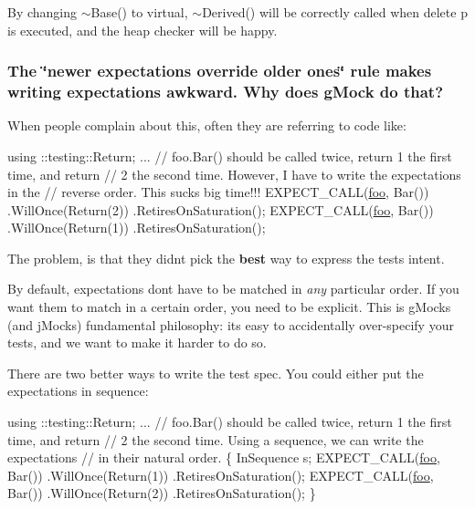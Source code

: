 By changing {\ttfamily $\sim$\+Base()} to virtual, {\ttfamily $\sim$\+Derived()} will be correctly called when {\ttfamily delete p} is executed, and the heap checker will be happy.

\subsubsection*{The \char`\"{}newer expectations override older ones\char`\"{} rule makes writing expectations awkward. Why does g\+Mock do that?}

When people complain about this, often they are referring to code like\+:


\begin{DoxyCode}
using ::testing::Return;
...
  \textcolor{comment}{// foo.Bar() should be called twice, return 1 the first time, and return}
  \textcolor{comment}{// 2 the second time.  However, I have to write the expectations in the}
  \textcolor{comment}{// reverse order.  This sucks big time!!!}
  EXPECT\_CALL(\mbox{\hyperlink{namespacefoo}{foo}}, Bar())
      .WillOnce(Return(2))
      .RetiresOnSaturation();
  EXPECT\_CALL(\mbox{\hyperlink{namespacefoo}{foo}}, Bar())
      .WillOnce(Return(1))
      .RetiresOnSaturation();
\end{DoxyCode}


The problem, is that they didn\textquotesingle{}t pick the {\bfseries best} way to express the test\textquotesingle{}s intent.

By default, expectations don\textquotesingle{}t have to be matched in {\itshape any} particular order. If you want them to match in a certain order, you need to be explicit. This is g\+Mock\textquotesingle{}s (and j\+Mock\textquotesingle{}s) fundamental philosophy\+: it\textquotesingle{}s easy to accidentally over-\/specify your tests, and we want to make it harder to do so.

There are two better ways to write the test spec. You could either put the expectations in sequence\+:


\begin{DoxyCode}
using ::testing::Return;
...
  \textcolor{comment}{// foo.Bar() should be called twice, return 1 the first time, and return}
  \textcolor{comment}{// 2 the second time.  Using a sequence, we can write the expectations}
  \textcolor{comment}{// in their natural order.}
  \{
    InSequence s;
    EXPECT\_CALL(\mbox{\hyperlink{namespacefoo}{foo}}, Bar())
        .WillOnce(Return(1))
        .RetiresOnSaturation();
    EXPECT\_CALL(\mbox{\hyperlink{namespacefoo}{foo}}, Bar())
        .WillOnce(Return(2))
        .RetiresOnSaturation();
  \}
\end{DoxyCode}


